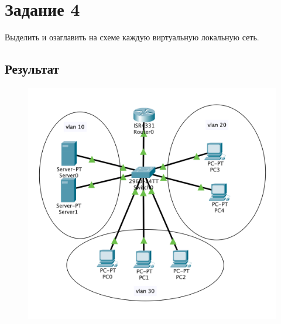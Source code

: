 \documentclass[a4paper,oneside,12pt]{extreport}
\begin{document}
\chapter{Задание 4}

Выделить и озаглавить на схеме каждую виртуальную локальную сеть.

\section{Результат}

\begin{figure}[H]
	\centering
	\includegraphics[width=0.7\linewidth]{inc/img/result.png}
\end{figure}
\end{document}
